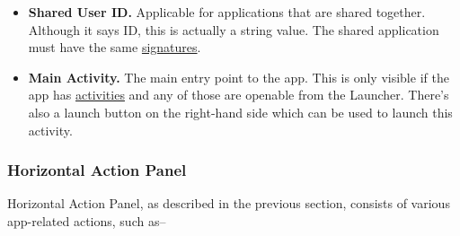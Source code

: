 \begin{itemize}
\begin{itemize}
        \item \textbf{Shared User ID.} Applicable for applications that are shared together. Although it says ID, this
        is actually a string value. The shared application must have the same
        \hyperref[subsec:signatures-tab]{signatures}.

        \item \textbf{Main Activity.} The main entry point to the app. This is only visible if the app has
        \hyperref[subsubsec:activities]{activities} and any of those are openable from the Launcher. There's also a
        launch button on the right-hand side which can be used to launch this activity.
    \end{itemize}
\end{itemize}

\subsubsection{Horizontal Action Panel}\label{subsubsec:horizontal-action-panel} %
Horizontal Action Panel, as described in the previous section, consists of various app-related actions, such as--
